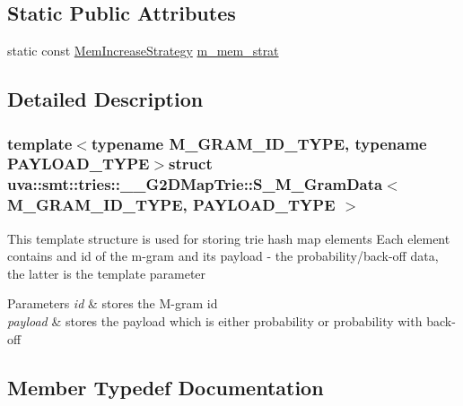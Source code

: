 \subsection*{Static Public Attributes}
\begin{DoxyCompactItemize}
\item 
static const \hyperlink{classuva_1_1smt_1_1tries_1_1alloc_1_1_mem_increase_strategy}{Mem\+Increase\+Strategy} \hyperlink{structuva_1_1smt_1_1tries_1_1_____g2_d_map_trie_1_1_s___m___gram_data_a8555512bef5fb68546af7cb50ae2ebd0}{m\+\_\+mem\+\_\+strat}
\end{DoxyCompactItemize}


\subsection{Detailed Description}
\subsubsection*{template$<$typename M\+\_\+\+G\+R\+A\+M\+\_\+\+I\+D\+\_\+\+T\+Y\+P\+E, typename P\+A\+Y\+L\+O\+A\+D\+\_\+\+T\+Y\+P\+E$>$struct uva\+::smt\+::tries\+::\+\_\+\+\_\+\+G2\+D\+Map\+Trie\+::\+S\+\_\+\+M\+\_\+\+Gram\+Data$<$ M\+\_\+\+G\+R\+A\+M\+\_\+\+I\+D\+\_\+\+T\+Y\+P\+E, P\+A\+Y\+L\+O\+A\+D\+\_\+\+T\+Y\+P\+E $>$}

This template structure is used for storing trie hash map elements Each element contains and id of the m-\/gram and its payload -\/ the probability/back-\/off data, the latter is the template parameter 
\begin{DoxyParams}{Parameters}
{\em id} & stores the M-\/gram id \\
\hline
{\em payload} & stores the payload which is either probability or probability with back-\/off \\
\hline
\end{DoxyParams}


\subsection{Member Typedef Documentation}
\hypertarget{structuva_1_1smt_1_1tries_1_1_____g2_d_map_trie_1_1_s___m___gram_data_a7dcd525c09a87470c75a0a379fda3ade}{}
